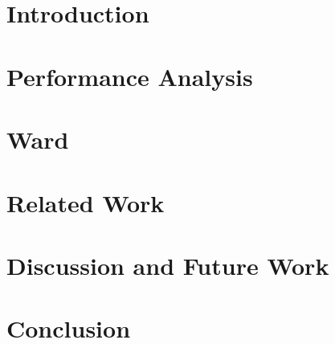 \documentclass[letterpaper,12pt,oneside]{book}
\begin{document}

~\newpage


~\newpage

%

\pagestyle{plain}
\tableofcontents

\chapter{Introduction}


\chapter{Performance Analysis}







\chapter{Ward}










\chapter{Related Work}


\chapter{Discussion and Future Work}


\chapter{Conclusion}


\pagebreak
{}

\end{document}
